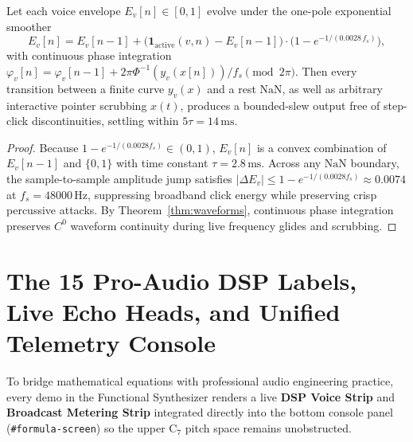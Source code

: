 \begin{theorem}
\label{thm:func-synth-click}
Let each voice envelope $E_v[n] \in [0, 1]$ evolve under the one-pole exponential smoother
\begin{equation}
E_v[n] = E_v[n-1] + \big(\mathbf{1}_{\mathrm{active}}(v, n) - E_v[n-1]\big)\cdot\Big(1 - e^{-1/(0.0028\,f_s)}\Big),
\end{equation}
with continuous phase integration $\varphi_v[n] = \varphi_v[n-1] + 2\pi \Phi^{-1}(y_v(x[n]))/f_s \pmod{2\pi}$. Then every transition between a finite curve $y_v(x)$ and a rest $\mathrm{NaN}$, as well as arbitrary interactive pointer scrubbing $x(t)$, produces a bounded-slew output free of step-click discontinuities, settling within $5\tau = 14\,\text{ms}$.
\end{theorem}

\begin{proof}
Because $1 - e^{-1/(0.0028 f_s)} \in (0, 1)$, $E_v[n]$ is a convex combination of $E_v[n-1]$ and $\{0, 1\}$ with time constant $\tau = 2.8\,\text{ms}$. Across any $\mathrm{NaN}$ boundary, the sample-to-sample amplitude jump satisfies $|\Delta E_v| \le 1 - e^{-1/(0.0028 f_s)} \approx 0.0074$ at $f_s = 48000\,\text{Hz}$, suppressing broadband click energy while preserving crisp percussive attacks. By Theorem~\ref{thm:waveforms}, continuous phase integration preserves $C^0$ waveform continuity during live frequency glides and scrubbing.
\end{proof}

\section{The 15 Pro-Audio DSP Labels, Live Echo Heads, and Unified Telemetry Console}

To bridge mathematical equations with professional audio engineering practice, every demo in the Functional Synthesizer renders a live \textbf{DSP Voice Strip} and \textbf{Broadcast Metering Strip} integrated directly into the bottom console panel (\texttt{\#formula-screen}) so the upper $\mathrm{C}_7$ pitch space remains unobstructed.

